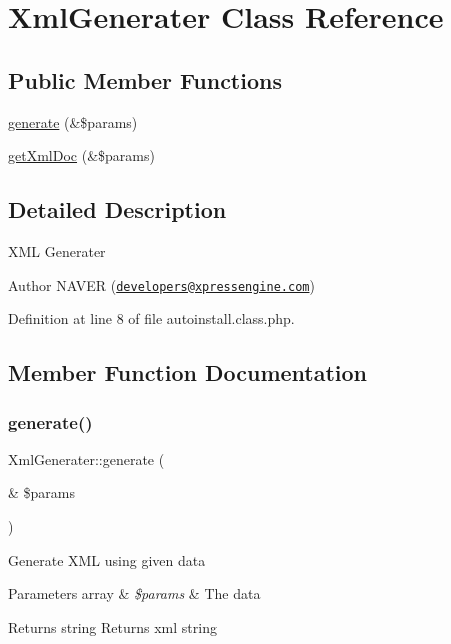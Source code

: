 \hypertarget{classXmlGenerater}{}\section{Xml\+Generater Class Reference}
\label{classXmlGenerater}
\subsection*{Public Member Functions}
\begin{DoxyCompactItemize}
\item 
\hyperlink{classXmlGenerater_a550936fddc7d2954e46b1e72846e4d89}{generate} (\&\$params)
\item 
\hyperlink{classXmlGenerater_a2c76cbd93596f5f7d48ff2ff0b9213ce}{get\+Xml\+Doc} (\&\$params)
\end{DoxyCompactItemize}


\subsection{Detailed Description}
X\+ML Generater \begin{DoxyAuthor}{Author}
N\+A\+V\+ER (\href{mailto:developers@xpressengine.com}{\tt developers@xpressengine.\+com}) 
\end{DoxyAuthor}


Definition at line 8 of file autoinstall.\+class.\+php.



\subsection{Member Function Documentation}
\mbox{\label{classXmlGenerater_a550936fddc7d2954e46b1e72846e4d89}} 
\subsubsection{\texorpdfstring{generate()}{generate()}}
{\footnotesize\ttfamily Xml\+Generater\+::generate (\begin{DoxyParamCaption}\item[{\&}]{\$params }\end{DoxyParamCaption})}

Generate X\+ML using given data


\begin{DoxyParams}[1]{Parameters}
array & {\em \$params} & The data \\
\hline
\end{DoxyParams}
\begin{DoxyReturn}{Returns}
string Returns xml string 
\end{DoxyReturn}


